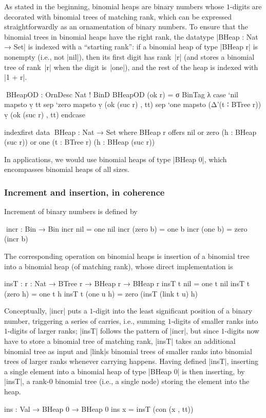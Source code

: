 As stated in the beginning, binomial heaps are binary numbers whose $1$-digits are decorated with binomial trees of matching rank, which can be expressed straightforwardly as an ornamentation of binary numbers.
To ensure that the binomial trees in binomial heaps have the right rank, the datatype |BHeap : Nat → Set| is indexed with a ``starting rank'': if a binomial heap of type |BHeap r| is nonempty (i.e., not |nil|), then its first digit has rank~|r| (and stores a binomial tree of rank~|r| when the digit is~|one|), and the rest of the heap is indexed with |1 + r|.
\begin{code}
^^^BHeapOD : OrnDesc Nat ! BinD
BHeapOD (ok r) = σ BinTag λ  case  `nil   mapsto  ṿ tt
                             sep   `zero  mapsto  ṿ (ok (suc r) , tt)
                             sep   `one   mapsto  (Δ'(t ∶ BTree r)) ṿ (ok (suc r) , tt) endcase

indexfirst data ^^^BHeap : Nat → Set where
  BHeap r  offers  nil
           or      zero  (h : BHeap (suc r))
           or      one   (t : BTree r) (h : BHeap (suc r))
\end{code}
In applications, we would use binomial heaps of type |BHeap 0|, which encompasses binomial heaps of all sizes.

\subsubsection{Increment and insertion, in coherence}
Increment of binary numbers is defined by
\begin{code}
^^^incr : Bin → Bin
incr nil        =  one nil
incr (zero  b)  =  one b
incr (one   b)  =  zero (incr b)
\end{code}
The corresponding operation on binomial heaps is insertion of a binomial tree into a binomial heap (of matching rank), whose direct implementation is
\begin{code}
insT : {r : Nat} → BTree r → BHeap r → BHeap r
insT t nil         = one t nil
insT t (zero   h)  = one t h
insT t (one u  h)  = zero (insT (link t u) h)
\end{code}
Conceptually, |incr| puts a $1$-digit into the least significant position of a binary number, triggering a series of carries, i.e., summing $1$-digits of smaller ranks into $1$-digits of larger ranks; |insT| follows the pattern of |incr|, but since $1$-digits now have to store a binomial tree of matching rank, |insT| takes an additional binomial tree as input and |link|s binomial trees of smaller ranks into binomial trees of larger ranks whenever carrying happens.
Having defined |insT|, inserting a single element into a binomial heap of type |BHeap 0| is then inserting, by |insT|, a rank-$0$ binomial tree (i.e., a single node) storing the element into the heap.
\begin{code}
ins : Val → BHeap 0 → BHeap 0
ins x = insT (con (x , tt))
\end{code}

